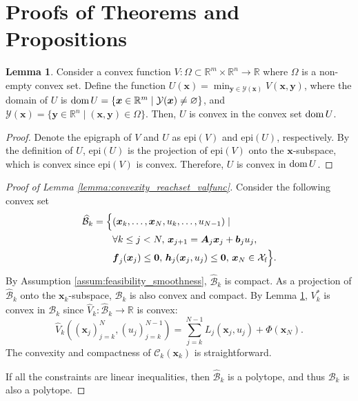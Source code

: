 \documentclass[journal]{IEEEtran}
\theoremstyle{definition}
\newtheorem{lemma}{Lemma}
\theoremstyle{definition}
\newcommand\R{{\mathbb{R}}}
\renewcommand\vector[1]{\boldsymbol{#1}}
\newcommand\vb{{\vector{b}}}
\newcommand\vf{{\vector{f}}}
\newcommand\vh{{\vector{h}}}
\newcommand\vx{{\vector{x}}}
\newcommand\vy{{\vector{y}}}
\newcommand\vA{{\vector{A}}}
\newcommand\vzero{{\vector{0}}}
\newcommand\dom{{\text{dom\,}}}
\begin{document}
\section{Proofs of Theorems and Propositions}\label{app:proofs}

\begin{lemma}\label{lemma:min_is_convex}
    Consider a convex function $V:\Omega\subset\R^m\times\R^n\to\R$ where $\Omega$ is a non-empty convex set. Define the function $U(\vx)=\min_{\vy\in\mathcal{Y}(\vx)} V(\vx,\vy)$, where the domain of $U$ is $\dom U=\{\vx\in\R^m\mid \mathcal{Y}(\vx)\neq\varnothing\}$, and $\mathcal{Y}(\vx)=\{\vy\in\R^n\mid (\vx,\vy)\in\Omega\}$. Then, $U$ is convex in the convex set $\dom U$.
\end{lemma}

\begin{proof}
    Denote the epigraph of $V$ and $U$ as $\text{epi}(V)$ and $\text{epi}(U)$, respectively. By the definition of $U$, $\text{epi}(U)$ is the projection of $\text{epi}(V)$ onto the $\vx$-subspace, which is convex since $\text{epi}(V)$ is convex. Therefore, $U$ is convex in $\dom U$.
\end{proof}

\begin{proof}[Proof of Lemma \ref{lemma:convexity_reachset_valfunc}]
    Consider the following convex set
    \begin{align}
        \widehat{\mathcal{B}}_k=\Big\{&(\vx_{k}, \ldots, \vx_N, u_k, \ldots, u_{N-1})\mid \notag\\
        &\forall k\leq j<N,\,\vx_{j+1} = \vA_j\vx_j+\vb_j u_j, \notag\\
        &\vf_j(\vx_j) \leq \vzero,\,\vh_j(\vx_j, u_j) \leq \vzero,\,\vx_N \in \mathcal{X}_\text{f} \Big\}.\label{eq:widehat_backward_set}
    \end{align}
    By Assumption \ref{assum:feasibility_smoothness}, $\widehat{\mathcal{B}}_k$ is compact. As a projection of $\widehat{\mathcal{B}}_k$ onto the $\vx_k$-subspace, $\mathcal{B}_k$ is also convex and compact. By Lemma \ref{lemma:min_is_convex}, $V_k^*$ is convex in $\mathcal{B}_k$ since $\widehat{V}_k:\widehat{\mathcal{B}}_k\to\R$ is convex:
    \begin{equation}
        \widehat{V}_k\left((\vx_j)_{j=k}^N, (u_j)_{j=k}^{N-1}\right) = \sum_{j=k}^{N-1} L_j(\vx_j, u_j) + \Phi(\vx_N).
    \end{equation}
    The convexity and compactness of $\mathcal{C}_k(\vx_k)$ is straightforward.

    If all the constraints are linear inequalities, then $\widehat{\mathcal{B}}_k$ is a polytope, and thus $\mathcal{B}_k$ is also a polytope.
\end{proof}
\end{document}
